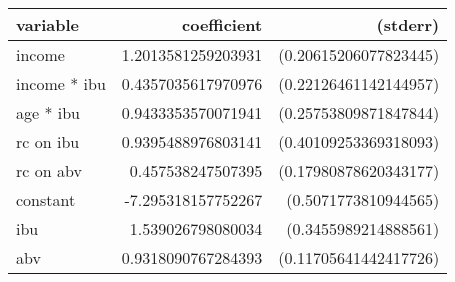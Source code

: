 \begin{tabular}{lrr}
\textbf{variable}&\textbf{coefficient}&\textbf{(stderr)}\\
\hline

income&1.2013581259203931&(0.20615206077823445)\\
income * ibu&0.4357035617970976&(0.22126461142144957)\\
age * ibu&0.9433353570071941&(0.25753809871847844)\\
rc on ibu&0.9395488976803141&(0.40109253369318093)\\
rc on abv&0.457538247507395&(0.17980878620343177)\\
constant&-7.295318157752267&(0.5071773810944565)\\
ibu&1.539026798080034&(0.3455989214888561)\\
abv&0.9318090767284393&(0.11705641442417726)\\
\end{tabular}

